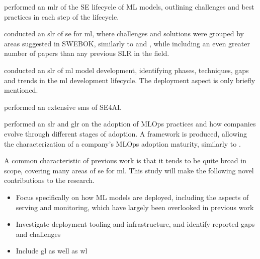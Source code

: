 \textcite{John2021} performed an \acrshort{mlr} of the SE lifecycle of ML models, outlining challenges and best practices in each step of the lifecycle.

\textcite{Giray2021} conducted an \acrshort{slr} of \acrshort{se} for \acrshort{ml}, where challenges and solutions were grouped by areas suggested in SWEBOK, similarly to \cite{Kumeno2020} and \cite{Nascimento2020}, while including an even greater number of papers than any previous SLR in the field.

\textcite{Lorenzoni2021} conducted an \acrshort{slr} of \acrshort{ml} model development, identifying phases, techniques, gaps and trends in the \acrshort{ml} development lifecycle.
The deployment aspect is only briefly mentioned.

\textcite{MartinezFernandez2021} performed an extensive \acrshort{sms} of SE4AI.


\textcite{John2021a} performed an \acrshort{slr} and \acrshort{glr} on the adoption of MLOps practices and how companies evolve through different stages of adoption.
A framework is produced, allowing the characterization of a company's MLOps adoption maturity, similarly to \cite{Lwakatare2020a}.

A common characteristic of previous work is that it tends to be quite broad in scope, covering many areas of \acrshort{se} for \acrshort{ml}.
This study will make the following novel contributions to the research.
\begin{itemize}
    \item Focus specifically on how ML models are deployed, including the aspects of serving and monitoring, which have largely been overlooked in previous work
    \item Investigate deployment tooling and infrastructure, and identify reported gaps and challenges
    \item Include \acrshort{gl} as well as \acrshort{wl}
\end{itemize}

